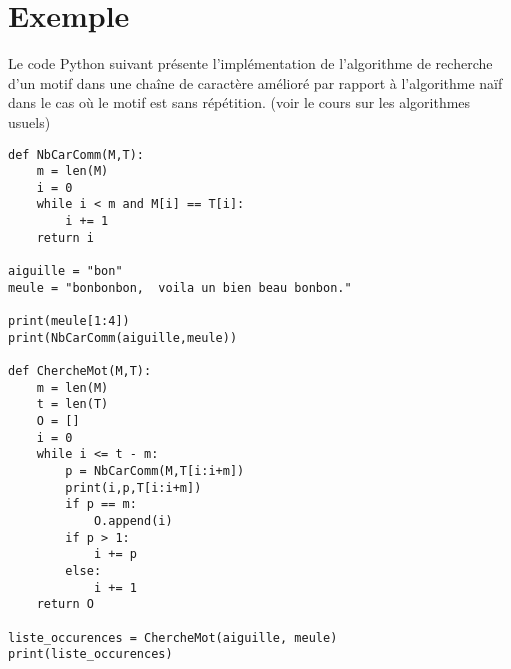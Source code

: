 \section{Exemple}
Le code Python suivant présente l'implémentation de l'algorithme de recherche d'un motif dans une chaîne de caractère amélioré par rapport à l'algorithme naïf dans le cas où le motif est sans répétition. (voir le cours sur les algorithmes usuels)
\begin{verbatim}
def NbCarComm(M,T):
    m = len(M)
    i = 0
    while i < m and M[i] == T[i]:
        i += 1
    return i
    
aiguille = "bon"
meule = "bonbonbon,  voila un bien beau bonbon."

print(meule[1:4])
print(NbCarComm(aiguille,meule))

def ChercheMot(M,T):
    m = len(M)
    t = len(T)
    O = []
    i = 0
    while i <= t - m:
        p = NbCarComm(M,T[i:i+m])
        print(i,p,T[i:i+m])
        if p == m:
            O.append(i)
        if p > 1:
            i += p
        else:
            i += 1
    return O
    
liste_occurences = ChercheMot(aiguille, meule)
print(liste_occurences)
\end{verbatim}


